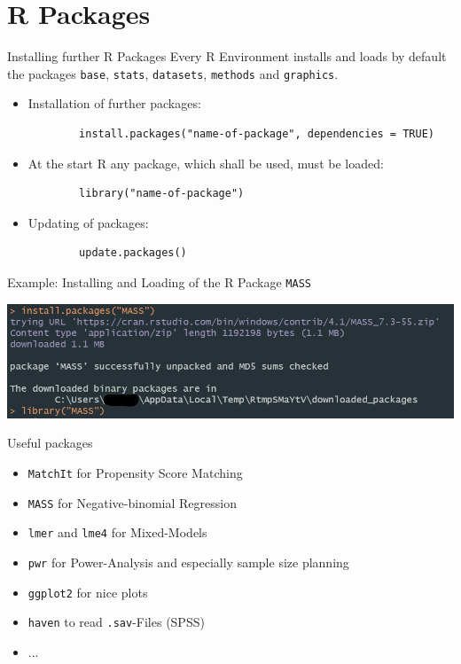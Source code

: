\documentclass[xcolor=dvipsnames, aspectratio = 169]{beamer}
\begin{document}

	


\section{\textsf R Packages}


\begin{frame}[fragile]{Installing further \textsf R Packages}
    Every \textsf R Environment installs and loads by default the packages \texttt{base}, \texttt{stats}, \texttt{datasets}, \texttt{methods} and \texttt{graphics}.\bigskip
    \begin{itemize}
        \item Installation of further packages:
        \begin{verbatim}
        install.packages("name-of-package", dependencies = TRUE)
        \end{verbatim}
        \item At the start R any package, which shall be used, must be loaded:
        \begin{verbatim}
        library("name-of-package")
        \end{verbatim}
        \item Updating of packages:
        \begin{verbatim}
        update.packages()
        \end{verbatim}
    \end{itemize}
\end{frame}

\begin{frame}[fragile]{Example: Installing and Loading of the \textsf R Package \texttt{MASS}}
    \begin{center}
        \includegraphics[width=\textwidth, keepaspectratio]{pakete.png}
    \end{center}
\end{frame}


\begin{frame}[fragile]{Useful packages}
	\begin{itemize}
		\item \verb+MatchIt+ for Propensity Score Matching 
	          \item \verb+MASS+ for Negative-binomial Regression
	          \item \verb+lmer+ and \verb+lme4+ for Mixed-Models 
	          \item \verb+pwr+ for Power-Analysis and especially sample size planning
	          \item \verb+ggplot2+ for nice plots
	          \item \verb+haven+ to read \verb+.sav+-Files (SPSS)
	          \item ...
	\end{itemize}
\end{frame}
	
\end{document}
